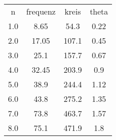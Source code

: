 \begin{table}
\begin{tabular}{cccc}
n & frequenz & kreis & theta \\
1.0 & 8.65 & 54.3 & 0.22 \\
2.0 & 17.05 & 107.1 & 0.45 \\
3.0 & 25.1 & 157.7 & 0.67 \\
4.0 & 32.45 & 203.9 & 0.9 \\
5.0 & 38.9 & 244.4 & 1.12 \\
6.0 & 43.8 & 275.2 & 1.35 \\
7.0 & 73.8 & 463.7 & 1.57 \\
8.0 & 75.1 & 471.9 & 1.8 \\
\end{tabular}
\end{table}
